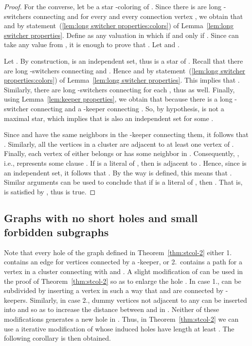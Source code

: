 \documentclass[a4paper, 11pt, oneside]{article}
\begin{document}
\begin{proof}
  For the converse, let  be a star -coloring of .  Since there is are long -switchers connecting  and  for every  and every connection vertex , we obtain that  and  by statement~(\ref{lem:long switcher properties:colors}) of Lemma~\ref{lem:long switcher properties}. Define  as any valuation in which  if and only if .  Since  can take any value from , it is enough to prove that .  Let  and .

  Let .  By construction,  is an independent set, thus  is a star of .  Recall that there are long -switchers connecting  and .  Hence  and  by statement~(\ref{lem:long switcher properties:colors}) of Lemma~\ref{lem:long switcher properties}.  This implies that .  Similarly, there are long -switchers connecting  for each , thus  as well.  Finally, using Lemma~\ref{lem:keeper properties}, we obtain that  because there is a long -switcher connecting  and a -keeper connecting .  So, by hypothesis,  is not a maximal star, which implies that  is also an independent set for some .

  Since  and  have the same neighbors in the -keeper  connecting them, it follows that .  Similarly, all the vertices in a cluster are adjacent to at least one vertex of .  Finally, each vertex of  either belongs or has some neighbor in .  Consequently, , i.e.,  represents some clause .  If  is a literal of , then  is adjacent to .  Hence, since  is an independent set, it follows that .  By the way  is defined, this means that .  Similar arguments can be used to conclude that if  is a literal of , then .  That is,  is satisfied by , thus  is true.
\end{proof}

\subsection{Graphs with no short holes and small forbidden subgraphs}
\label{sec:chordal}

Note that every hole  of the graph  defined in Theorem~\ref{thm:stcol-2} either 1. contains an edge  for vertices  connected by a -keeper, or 2.\ contains a path  for a vertex  in a cluster  connecting  with  and .  A slight modification of  can be used in the proof of Theorem~\ref{thm:stcol-2} so as to enlarge the hole .  In case 1.,  can be subdivided by inserting a vertex  in such a way that  and  are connected by -keepers.  Similarly, in case 2., dummy vertices not adjacent to any  can be inserted into  and  so as to increase the distance between  and  in .  Neither of these modifications generates a new hole in .  Thus, in Theorem~\ref{thm:stcol-2} we can use a iterative modification of  whose induced holes have length at least .  The following corollary is then obtained.
\end{document}
